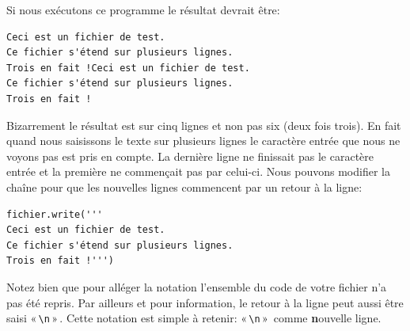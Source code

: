 Si nous exécutons ce programme le résultat devrait être:

\begin{Verbatim}[frame=single,rulecolor=\color{gray}, label=résultat en mode ajout]
Ceci est un fichier de test.
Ce fichier s'étend sur plusieurs lignes.
Trois en fait !Ceci est un fichier de test.
Ce fichier s'étend sur plusieurs lignes.
Trois en fait !
\end{Verbatim}

Bizarrement le résultat est sur cinq lignes et non pas six (deux fois trois). En fait quand nous saisissons le texte sur plusieurs lignes le caractère entrée que nous ne voyons pas est pris en compte. La dernière ligne ne finissait pas le caractère entrée et la première ne commençait pas par celui-ci.
Nous pouvons modifier la chaîne pour que les nouvelles lignes commencent par un retour à la ligne:

\begin{Verbatim}[frame=single,rulecolor=\color{mbleu}, label=à taper]
fichier.write('''
Ceci est un fichier de test.
Ce fichier s'étend sur plusieurs lignes.
Trois en fait !''')
\end{Verbatim}

Notez bien que pour alléger la notation l'ensemble du code de votre fichier n'a pas été repris. Par ailleurs et pour information, le retour à la ligne peut aussi être saisi « \Verb+\n+ » . Cette notation est simple à retenir: « \Verb+\n+ »  comme \textbf{n}ouvelle ligne.



\newpage
\thispagestyle{empty}
